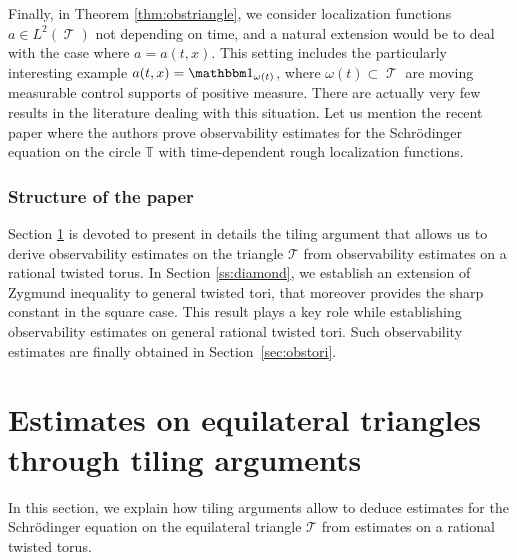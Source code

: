 \documentclass[a4paper,11pt]{amsart}
\numberwithin{equation}{section}
\theoremstyle{definition}
\DeclareMathOperator{\var}{\mathcal T}
\begin{document}
Finally, in Theorem \ref{thm:obstriangle}, we consider localization functions $a\in L^2(\var)$ not depending on time, and a natural extension would be to deal with the case where $a = a(t,x)$. This setting includes the particularly interesting example $a(t,x) = \mathbbm1_{\omega(t)}$, where $\omega(t)\subset\var$ are moving measurable control supports 
of positive measure. There are actually very few results in the literature dealing with this situation. Let us mention the recent paper \cite{NWX} where the authors prove observability estimates for the Schr\"odinger equation on the circle $\mathbb T$ with time-dependent rough localization functions. 

\medskip

\subsubsection*{Structure of the paper}
Section \ref{sec:til} is devoted to present in details the tiling argument that allows us to derive observability estimates on the triangle $\mathcal T$ from observability estimates on a rational twisted torus. In Section \ref{ss:diamond}, we establish an extension of Zygmund inequality to general twisted tori, that moreover provides the sharp constant in the square case. This result plays a key role while establishing observability estimates on general rational twisted tori. Such observability estimates 
are finally obtained in Section~\ref{sec:obstori}. 

\section{Estimates on equilateral triangles through tiling arguments} \label{sec:til}

In this section, we explain how tiling arguments allow to deduce estimates for the Schr\"odinger equation on the equilateral triangle $\mathcal T$ from estimates on a rational twisted torus.
\end{document}

